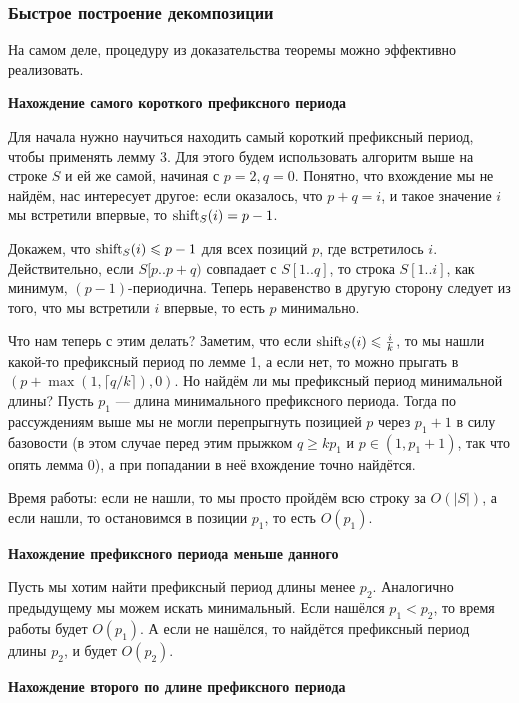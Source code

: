 \subsubsection{Быстрое построение декомпозиции}
На самом деле, процедуру из доказательства теоремы можно эффективно реализовать.

\textbf{Нахождение самого короткого префиксного периода}

Для начала нужно научиться находить самый короткий префиксный период, чтобы применять лемму 3.
Для этого будем использовать алгоритм выше на строке $S$ и ей же самой, начиная с $p = 2, q = 0$. 
Понятно, что вхождение мы не найдём, нас интересует другое: если оказалось, что $p + q = i$, и такое значение $i$ мы встретили впервые, то $\operatorname{shift}_S(i) = p - 1$.

Докажем, что $\operatorname{shift}_S(i) \leqslant p - 1$ для всех позиций $p$, где встретилось $i$.
Действительно, если $S[p..p + q)$ совпадает с $S[1..q]$, то строка $S[1..i]$, как минимум, $(p - 1)$-периодична.
Теперь неравенство в другую сторону следует из того, что мы встретили $i$ впервые, то есть $p$ минимально.

Что нам теперь с этим делать?
Заметим, что если $\operatorname{shift}_S(i) \leqslant \frac{i}{k}$, то мы нашли какой-то префиксный период по лемме 1, а если нет, то можно прыгать в $(p + \max(1, \lceil q / k \rceil), 0)$.
Но найдём ли мы префиксный период минимальной длины?
Пусть $p_1$ --- длина минимального префиксного периода.
Тогда по рассуждениям выше мы не могли перепрыгнуть позицией $p$ через $p_1 + 1$ в силу базовости (в этом случае перед этим прыжком $q \ge k p_1$ и $p \in (1, p_1 + 1)$, так что опять лемма 0), а при попадании в неё вхождение точно найдётся.

Время работы: если не нашли, то мы просто пройдём всю строку за $O(|S|)$, а если нашли, то остановимся в позиции $p_1$, то есть $O(p_1)$.

\textbf{Нахождение префиксного периода меньше данного}

Пусть мы хотим найти префиксный период длины менее $p_2$.
Аналогично предыдущему мы можем искать минимальный.
Если нашёлся $p_1 < p_2$, то время работы будет $O(p_1)$.
А если не нашёлся, то найдётся префиксный период длины $p_2$, и будет $O(p_2)$.

\textbf{Нахождение второго по длине префиксного периода}

